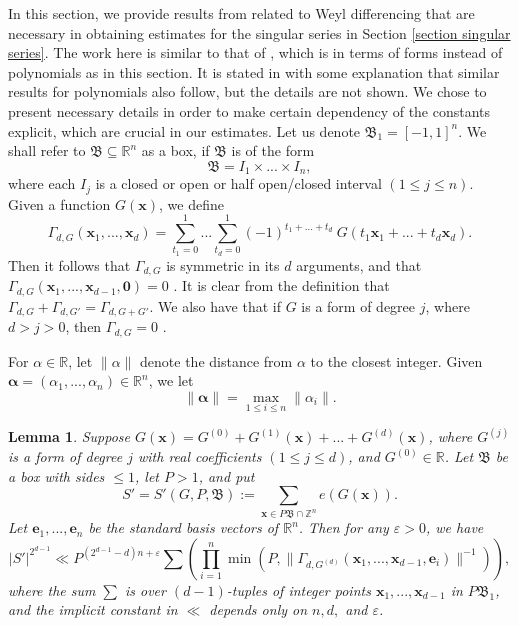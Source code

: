 \documentclass[12pt]{amsart}
\newtheorem{lem}[thm]{Lemma}
\theoremstyle{definition}
\theoremstyle{remark}
\numberwithin{equation}{section}
\begin{document}
In this section, we provide results from \cite{S} related to Weyl differencing
that are necessary in obtaining estimates for the singular series in Section \ref{section singular series}.
The work here is similar to that of \cite{S}, which is in terms of forms instead of polynomials as in this section. It is stated in
\cite{S} with some explanation that similar results for polynomials also follow, but the details are not shown. We chose to present necessary details in order to make certain dependency of the constants explicit, which are crucial in our estimates. Let us denote $\mathfrak{B}_1 = [-1,1]^n$. We shall refer to $\mathfrak{B} \subseteq \mathbb{R}^n$ as a box, if $\mathfrak{B}$ is of the form
$$
\mathfrak{B} = I_1 \times ... \times I_n,
$$
where each $I_j$ is a closed or open or half open/closed interval $(1 \leq j \leq n)$.
Given a function $G(\mathbf{x})$, we define
$$
\Gamma_{d, G} (\mathbf{x}_1, ..., \mathbf{x}_d) = \sum_{t_1=0}^1 ... \sum_{t_d=0}^1 (-1)^{t_1 + ... + t_d} \
G( t_1 \mathbf{x}_1 + ...+ t_d \mathbf{x}_d ).
$$
Then it follows that $\Gamma_{d, G}$ is symmetric in its $d$ arguments, and that
$\Gamma_{d, G} (\mathbf{x}_1, ...,\mathbf{x}_{d-1}, \mathbf{0}) = 0$ \cite[Section 11]{S}.
It is clear from the definition that
$\Gamma_{d, G} + \Gamma_{d, G'} = \Gamma_{d, G + G'}.$
We also have that if $G$ is a form of degree $j$, where $d > j > 0$, then $\Gamma_{d, G}= 0$ \cite[Lemma 11.2]{S}.

For $\alpha \in \mathbb{R}$, let $\| \alpha \|$ denote the
distance from $\alpha$ to the closest integer. Given $\boldsymbol{\alpha} = (\alpha_1, ..., \alpha_n) \in \mathbb{R}^n$,
we let
$$
\| \boldsymbol{\alpha} \| = \max_{1 \leq i \leq n} \| \alpha_i \|.
$$

\begin{lem}\cite[Lemma 13.1]{S}
\label{Lemma 13.1 in S}
Suppose $G(\mathbf{x}) = G^{(0)} + G^{(1)}(\mathbf{x} ) + ... + G^{(d)}(\mathbf{x} )$, where $G^{(j)}$ is a form of degree $j$
with real coefficients $(1 \leq j \leq d)$, and $G^{(0)} \in \mathbb{R}$. Let $\mathfrak{B}$ be a box with sides $\leq 1$, let $P > 1$, and put
$$
S' = S'( G, P , \mathfrak{B} ) := \sum_{\mathbf{x} \in P \mathfrak{B} \cap \mathbb{Z}^n } e(G(\mathbf{x})).
$$
Let $\mathbf{e}_1, ... , \mathbf{e}_{n}$ be the standard basis vectors of $\mathbb{R}^n$.
Then for any $\varepsilon > 0$, 
we have
$$
|S'|^{2^{d-1}} \ll P^{ (2^{d-1} -d )n + \varepsilon} \sum \left(
\prod_{i=1}^n \min ( P, \|   \Gamma_{d, G^{(d)}} ( \mathbf{x}_1, ... , \mathbf{x}_{d-1}, \mathbf{e}_i  ) \|^{-1}   )
 \right),
$$
where the sum $\sum$ is over $(d-1)$-tuples of integer points $\mathbf{x}_1, ... , \mathbf{x}_{d-1}$ in $P \mathfrak{B}_1$,
and the implicit constant in $\ll$ depends only on $n,d,$ and $\varepsilon$.
\end{lem}
\end{document}

